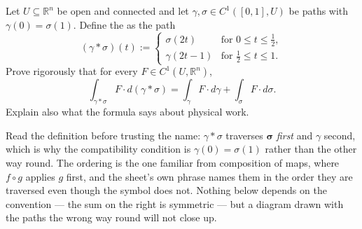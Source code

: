 \begin{exercise}
\label{ex:path_concatenation_work}
Let $U \subseteq \mathbb{R}^n$ be open and connected and let $\gamma,\sigma \in C^1([0,1],U)$ be
paths with $\gamma(0) = \sigma(1)$. Define the 
 as the path
\[(\gamma * \sigma)(t) := \begin{cases}
  \sigma(2t) & \text{for } 0 \le t \le \tfrac12, \\
  \gamma(2t-1) & \text{for } \tfrac12 \le t \le 1.
\end{cases}\]
Prove rigorously that for every $F \in C^1(U,\mathbb{R}^n)$,
\[\int_{\gamma*\sigma} F \cdot d(\gamma*\sigma) = \int_\gamma F \cdot d\gamma
  + \int_\sigma F \cdot d\sigma.\]
Explain also what the formula says about physical work.
\end{exercise}

\begin{ainote}
Read the definition before trusting the name: $\gamma * \sigma$ traverses $\boldsymbol{\sigma}$
\emph{first} and $\gamma$ second, which is why the compatibility condition is
$\gamma(0) = \sigma(1)$ rather than the other way round. The ordering is the one familiar from
composition of maps, where $f \circ g$ applies $g$ first, and the sheet's own phrase
 names them in the order they are traversed even though
the symbol does not. Nothing below depends on the convention --- the sum on the right is symmetric
--- but a diagram drawn with the paths the wrong way round will not close up.
\end{ainote}

